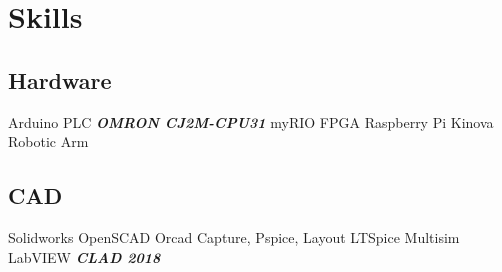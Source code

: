 \documentclass[letterpaper]{deedy-resume} %
\begin{document}
\begin{minipage}[t]{0.33\textwidth}
%
%
%
%
%
%

\sectionspace %


\section{Skills}

\subsection{Hardware}
Arduino \textbullet{} PLC {\footnotesize \textit{\textbf{OMRON CJ2M-CPU31}}}
\textbullet{} myRIO \textbullet{} FPGA \textbullet{} Raspberry Pi
\textbullet{} Kinova Robotic Arm

\sectionspace

\subsection{CAD}
Solidworks \textbullet{} OpenSCAD
\textbullet{} Orcad Capture, Pspice, Layout 
\textbullet{} LTSpice \textbullet{} Multisim 
\textbullet{} LabVIEW {\footnotesize \textit{\textbf{CLAD 2018}}}


\end{minipage}
\end{document}
